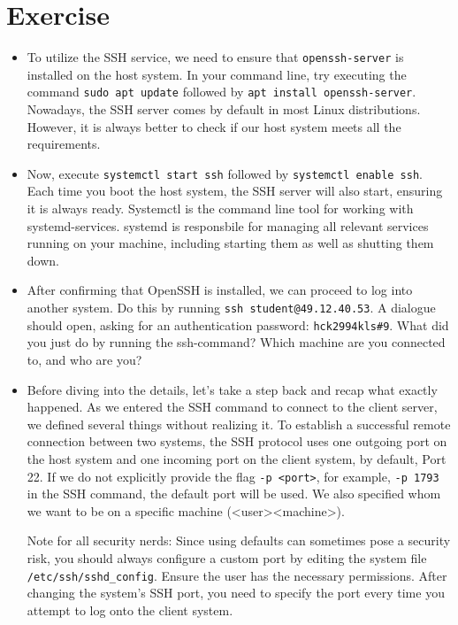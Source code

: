 \documentclass{dcbl/challenge}
\begin{document}
\section*{Exercise}
\begin{aufgabe}
\begin{itemize}
    \item To utilize the SSH service, we need to ensure that \texttt{openssh-server} is installed on the host system. In your command line, try executing the command \texttt{sudo apt update} followed by \texttt{apt install openssh-server}. Nowadays, the SSH server comes by default in most Linux distributions. However, it is always better to check if our host system meets all the requirements.

    \item Now, execute \texttt{systemctl start ssh} followed by \texttt{systemctl enable ssh}. Each time you boot the host system, the SSH server will also start, ensuring it is always ready. Systemctl is the command line tool for working with systemd-services. systemd is responsbile for managing all relevant services running on your machine, including starting them as well as shutting them down.

    \item After confirming that OpenSSH is installed, we can proceed to log into another system. Do this by running \texttt{ssh student@49.12.40.53}. 
    A dialogue should open, asking for an authentication password: \texttt{hck2994kls\#9}. What did you just do by running the ssh-command? Which machine are you connected to, and who are you?
    
    \item Before diving into the details, let's take a step back and recap what exactly happened. As we entered the SSH command to connect to the client server, we defined several things without realizing it. To establish a successful remote connection between two systems, the SSH protocol uses one outgoing port on the host system and one incoming port on the client system, by default, Port 22. If we do not explicitly provide the flag \texttt{-p <port>}, for example, \texttt{-p 1793} in the SSH command, the default port will be used. We also specified whom we want to be on a specific machine (<user>\@<machine>).

    Note for all security nerds:
    Since using defaults can sometimes pose a security risk, you should always configure a custom port by editing the system file \texttt{/etc/ssh/sshd\_config}. Ensure the user has the necessary permissions. After changing the system's SSH port, you need to specify the port every time you attempt to log onto the client system.


\end{itemize}
\end{aufgabe}
\end{document}
